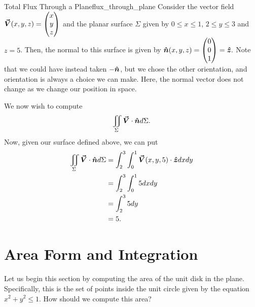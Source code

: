         \begin{ex}{Total Flux Through a Plane}{flux_through_plane}
        	Consider the vector field $\boldsymbol{\vec{V}}(x,y,z) = \begin{pmatrix} x \\ y \\ z \end{pmatrix}$ and the planar surface $\Sigma$ given by $0\leq x \leq 1$, $2\leq y \leq 3$ and $z=5$.  Then, the normal to this surface is given by $\boldsymbol{\hat{n}}(x,y,z) = \begin{pmatrix} 0 \\ 0 \\ 1 \end{pmatrix} = \boldsymbol{\hat{z}}.$ Note that we could have instead taken $-\boldsymbol{\hat{n}}$, but we chose the other orientation, and orientation is always a choice we can make.  Here, the normal vector does not change as we change our position in space.

        	We now wish to compute
        	\[
        	\iint_\Sigma \boldsymbol{\vec{V}} \cdot \boldsymbol{\hat{n}} d\Sigma.
        	\]
        	Now, given our surface defined above, we can put
        	\begin{align*}
        	\iint_\Sigma \boldsymbol{\vec{V}} \cdot \boldsymbol{\hat{n}} d\Sigma &= \int_2^3 \int_0^1 \boldsymbol{\vec{V}}(x,y,5) \cdot \boldsymbol{\hat{z}} dxdy\\
        	&= \int_2^3 \int_0^1 5 dx dy\\
        	&= \int_2^3 5 dy\\
        	&= 5.
        	\end{align*}
        \end{ex}




                                      \section{Area Form and Integration}

                                      Let us begin this section by computing the area of the unit disk in the plane.  Specifically, this is the set of points inside the unit circle given by the equation $x^2+y^2\leq 1$.  How should we compute this area?

